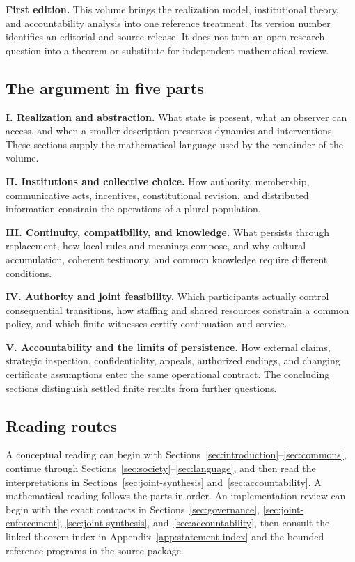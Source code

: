 \documentclass[11pt,letterpaper]{article}
\theoremstyle{plain}
\theoremstyle{definition}
\theoremstyle{remark}
\begin{document}
\noindent\textbf{First edition.} This volume brings the realization model, institutional theory, and accountability analysis into one reference treatment. Its version number identifies an editorial and source release. It does not turn an open research question into a theorem or substitute for independent mathematical review.

\subsection*{The argument in five parts}

\noindent\textbf{I. Realization and abstraction.} What state is present, what an observer can access, and when a smaller description preserves dynamics and interventions. These sections supply the mathematical language used by the remainder of the volume.

\noindent\textbf{II. Institutions and collective choice.} How authority, membership, communicative acts, incentives, constitutional revision, and distributed information constrain the operations of a plural population.

\noindent\textbf{III. Continuity, compatibility, and knowledge.} What persists through replacement, how local rules and meanings compose, and why cultural accumulation, coherent testimony, and common knowledge require different conditions.

\noindent\textbf{IV. Authority and joint feasibility.} Which participants actually control consequential transitions, how staffing and shared resources constrain a common policy, and which finite witnesses certify continuation and service.

\noindent\textbf{V. Accountability and the limits of persistence.} How external claims, strategic inspection, confidentiality, appeals, authorized endings, and changing certificate assumptions enter the same operational contract. The concluding sections distinguish settled finite results from further questions.

\subsection*{Reading routes}

A conceptual reading can begin with Sections~\ref{sec:introduction}--\ref{sec:commons}, continue through Sections~\ref{sec:society}--\ref{sec:language}, and then read the interpretations in Sections~\ref{sec:joint-synthesis} and~\ref{sec:accountability}. A mathematical reading follows the parts in order. An implementation review can begin with the exact contracts in Sections~\ref{sec:governance}, \ref{sec:joint-enforcement}, \ref{sec:joint-synthesis}, and~\ref{sec:accountability}, then consult the linked theorem index in Appendix~\ref{app:statement-index} and the bounded reference programs in the source package.
\end{document}
